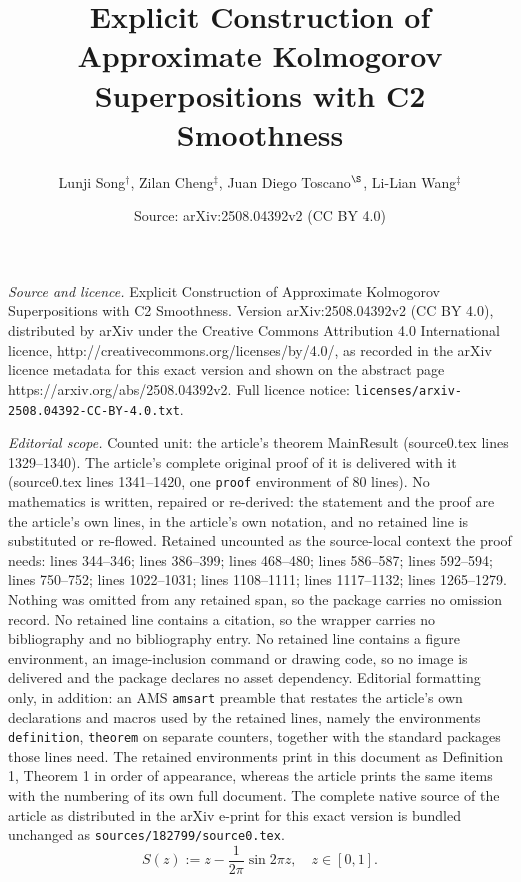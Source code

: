 \documentclass[10pt,a4paper]{amsart}
\title{Explicit Construction of Approximate Kolmogorov Superpositions with C2 Smoothness}
\author{Lunji Song$^\dagger$, Zilan Cheng$^\ddagger$, Juan Diego Toscano$^\S$, Li-Lian Wang$^\ddagger$}
\date{Source: arXiv:2508.04392v2 (CC BY 4.0)}
\begin{document}
\maketitle

\noindent\emph{Source and licence.} Explicit Construction of Approximate Kolmogorov Superpositions with C2 Smoothness. Version arXiv:2508.04392v2 (CC BY 4.0), distributed by arXiv under the Creative Commons Attribution 4.0 International licence, http://creativecommons.org/licenses/by/4.0/, as recorded in the arXiv licence metadata for this exact version and shown on the abstract page https://arxiv.org/abs/2508.04392v2. Full licence notice: \texttt{licenses/arxiv-2508.04392-CC-BY-4.0.txt}.\par\smallskip

\noindent\textit{Editorial scope.} Counted unit: the article's theorem MainResult (source0.tex lines 1329--1340). The article's complete original proof of it is delivered with it (source0.tex lines 1341--1420, one \texttt{proof} environment of 80 lines). No mathematics is written, repaired or re-derived: the statement and the proof are the article's own lines, in the article's own notation, and no retained line is substituted or re-flowed.  Retained uncounted as the source-local context the proof needs: lines 344--346; lines 386--399; lines 468--480; lines 586--587; lines 592--594; lines 750--752; lines 1022--1031; lines 1108--1111; lines 1117--1132; lines 1265--1279.  Nothing was omitted from any retained span, so the package carries no omission record.  No retained line contains a citation, so the wrapper carries no bibliography and no bibliography entry.  No retained line contains a figure environment, an image-inclusion command or drawing code, so no image is delivered and the package declares no asset dependency.  Editorial formatting only, in addition: an AMS \texttt{amsart} preamble that restates the article's own declarations and macros used by the retained lines, namely the environments \texttt{definition}, \texttt{theorem} on separate counters, together with the standard packages those lines need.  The retained environments print in this document as Definition 1, Theorem 1 in order of appearance, whereas the article prints the same items with the numbering of its own full document.  The complete native source of the article as distributed in the arXiv e-print for this exact version is bundled unchanged as \texttt{sources/182799/source0.tex}.
\begin{equation}\label{St}
    S(z):=z-\frac{1}{2\pi} \sin{2\pi z},\quad z\in [0,1].
\end{equation}
\end{document}
